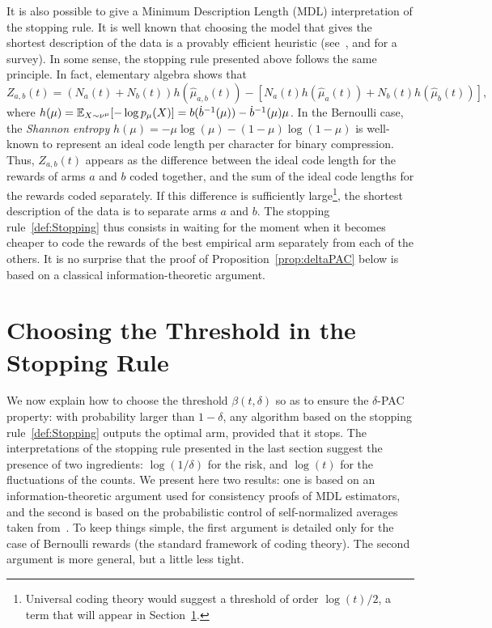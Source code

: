 \documentclass{colt2016} %
\begin{document}
It is also possible to give a Minimum Description Length (MDL) interpretation of the stopping rule. It is well known that choosing the model that gives the shortest description of the data is a provably efficient heuristic (see~\cite{Rissanen78}, and \cite{Grunwald07MDL} for a survey). In some sense, the stopping rule presented above follows the same principle. In fact, elementary algebra shows that 
\[Z_{a,b}(t) = (N_a(t) + N_b(t))h\left(\hat{\mu}_{a,b}(t)\right) - \left[N_a(t) h(\hat{\mu}_a(t)) + N_b(t)h(\hat{\mu}_b(t))\right],\]
where $h(\mu) = \mathbb{E}_{X\sim \nu^\mu}[-\log p_\mu(X)] = b(\dot{b}^{-1}(\mu)) - \dot{b}^{-1}(\mu) \mu$. %
In the Bernoulli case, the \emph{Shannon entropy} $h(\mu)=-\mu\log(\mu)-(1-\mu)\log(1-\mu)$ is well-known to represent an ideal code length per character for binary compression. Thus, $Z_{a,b}(t)$ appears as the difference between the ideal code length for the rewards of arms $a$ and $b$ coded together, and the sum of the ideal code lengths for the rewards coded separately. If this difference is sufficiently large\footnote{Universal coding theory would suggest a threshold of order $\log(t)/2$, a term that will appear in Section~\ref{sec:PACanalysis}.}, the shortest description of the data is to separate arms $a$ and $b$. The stopping rule~\eqref{def:Stopping} thus consists in waiting for the moment when it becomes cheaper to code the rewards of the best empirical arm separately from each of the others.
It is no surprise that the proof of Proposition~\ref{prop:deltaPAC} below is based on a classical information-theoretic argument.


\section{Choosing the Threshold in the Stopping Rule}\label{sec:PACanalysis}
We now explain how to choose the threshold $\beta(t,\delta)$ so as to ensure the $\delta$-PAC property: with probability larger than $1-\delta$, any algorithm based on the stopping rule~\eqref{def:Stopping} outputs the optimal arm, provided that it stops. The interpretations of the stopping rule presented in the last section suggest the presence of two ingredients: $\log(1/\delta)$ for the risk, and $\log(t)$ for the fluctuations of the counts. 
We present here two results: one is based on an information-theoretic argument used for consistency proofs of MDL estimators, and the second is based on the probabilistic control of self-normalized averages taken from~\cite{Combes14Lip}. %
To keep things simple, the first argument is detailed only for the case of Bernoulli rewards (the standard framework of coding theory). %
The second argument is more general, but a little less tight.
\end{document}
